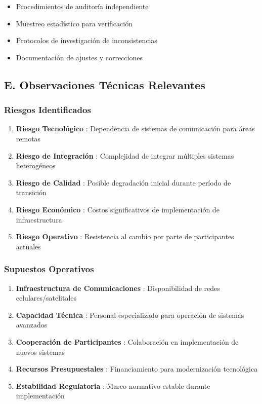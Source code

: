 \documentclass{cel}
\begin{document}
\begin{itemize}
\item Procedimientos de auditoría independiente
\item Muestreo estadístico para verificación
\item Protocolos de investigación de inconsistencias
\item Documentación de ajustes y correcciones


\end{itemize}
\subsection{E. Observaciones Técnicas Relevantes}
\nopagebreak

\subsubsection{Riesgos Identificados}
\nopagebreak

\begin{enumerate}
\item \textbf{Riesgo Tecnológico} : Dependencia de sistemas de comunicación para áreas remotas
\item \textbf{Riesgo de Integración} : Complejidad de integrar múltiples sistemas heterogéneos
\item \textbf{Riesgo de Calidad} : Posible degradación inicial durante período de transición
\item \textbf{Riesgo Económico} : Costos significativos de implementación de infraestructura
\item \textbf{Riesgo Operativo} : Resistencia al cambio por parte de participantes actuales

\end{enumerate}
\subsubsection{Supuestos Operativos}
\nopagebreak

\begin{enumerate}
\item \textbf{Infraestructura de Comunicaciones} : Disponibilidad de redes celulares/satelitales
\item \textbf{Capacidad Técnica} : Personal especializado para operación de sistemas avanzados
\item \textbf{Cooperación de Participantes} : Colaboración en implementación de nuevos sistemas
\item \textbf{Recursos Presupuestales} : Financiamiento para modernización tecnológica
\item \textbf{Estabilidad Regulatoria} : Marco normativo estable durante implementación

\end{enumerate}
\end{document}
